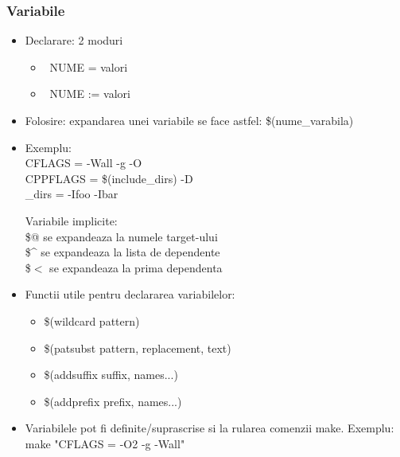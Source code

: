 \documentclass{beamer}
\begin{document}
    \begin{frame}[allowframebreaks]
    \frametitle{Variabile}
    \begin{itemize}
    \setlength{\itemsep}{0.5cm}
    \item Declarare: 2 moduri\\
        \begin{itemize}
        \item {\ttfamily\ NUME = valori}
        \item {\ttfamily\ NUME := valori}
        \end{itemize}
    \item Folosire: expandarea unei variabile se face astfel: {\ttfamily\$(nume\_varabila)}
    \item Exemplu:\\{\ttfamily CFLAGS = -Wall -g -O\\CPPFLAGS = \$(include\_dirs) -D\\_dirs = -Ifoo -Ibar}
    \begin{item}
    Variabile implicite:\\
    \$@ se expandeaza la numele target-ului\\
    \$\^{} se expandeaza la lista de dependente\\
    \$$<$ se expandeaza la prima dependenta
    \end{item}
    \item Functii utile pentru declararea variabilelor:\\\begin{itemize}\item \$(wildcard pattern)\item \$(patsubst pattern, replacement, text)\item \$(addsuffix suffix, names...)\item \$(addprefix prefix, names...)\end{itemize}
    \item Variabilele pot fi definite/suprascrise si la rularea comenzii make. Exemplu:\\{\ttfamily make "CFLAGS = -O2 -g -Wall"}
    \end{itemize}
    \end{frame}
\end{document}
